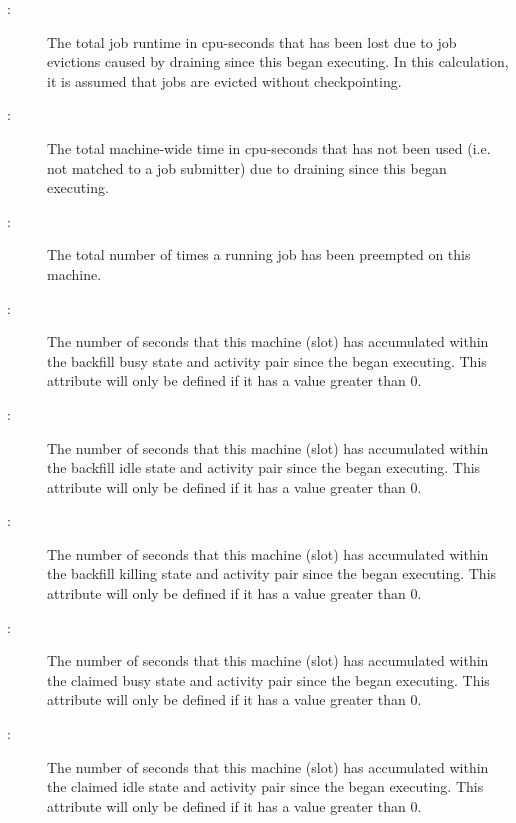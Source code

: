 \begin{description}
\item[:] The
total job runtime in cpu-seconds that has been lost due to job evictions
caused by draining since this  began executing.  In
this calculation, it is assumed that jobs are evicted without
checkpointing.
%
\item[:] The
total machine-wide time in cpu-seconds that has not been used
(i.e. not matched to a job submitter) due to draining since this
 began executing.
%
\item[:] The total number of times
a running job has been preempted on this machine.  
%
\item[:] The number of seconds
that this machine (slot) has accumulated within the
backfill busy state and activity pair since the 
began executing.
This attribute will only be defined if it has a value greater than 0.
%
\item[:] The number of seconds
that this machine (slot) has accumulated within the
backfill idle state and activity pair since the 
began executing.
This attribute will only be defined if it has a value greater than 0.
%
\item[:] The number of seconds
that this machine (slot) has accumulated within the
backfill killing state and activity pair since the 
began executing.
This attribute will only be defined if it has a value greater than 0.
%
\item[:] The number of seconds
that this machine (slot) has accumulated within the
claimed busy state and activity pair since the 
began executing.
This attribute will only be defined if it has a value greater than 0.
%
\item[:] The number of seconds
that this machine (slot) has accumulated within the
claimed idle state and activity pair since the 
began executing.
This attribute will only be defined if it has a value greater than 0.

\end{description}
